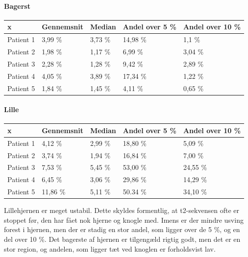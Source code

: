 \paragraph{Bagerst}

\begin{center}
    \begin{tabular}{| l | l | l | l | l |}
    \hline
    x & Gennemsnit & Median & Andel over 5 \% & Andel over 10 \% \\ \hline
    Patient 1 & 3,99 \% & 3,73 \% & 14,98 \% & 1,1 \% \\ \hline
    Patient 2 & 1,98 \% & 1,17 \% & 6,99 \% & 3,04 \% \\ \hline
    Patient 3 & 2,28 \% & 1,28 \% & 9,42 \% & 2,89 \% \\ \hline
    Patient 4 & 4,05 \% & 3,89 \% & 17,34 \% & 1,22 \% \\ \hline
    Patient 5 & 1,84 \% & 1,45 \% & 4,11 \% & 0,65 \% \\ \hline
    \end{tabular}
\end{center}

\paragraph{Lille}

\begin{center}
    \begin{tabular}{| l | l | l | l | l |}
    \hline
    x & Gennemsnit & Median & Andel over 5 \% & Andel over 10 \% \\ \hline
    Patient 1 & 4,12 \% & 2,99 \% & 18,80 \% & 5,09 \% \\ \hline
    Patient 2 & 3,74 \% & 1,94 \% & 16,84 \% & 7,00 \% \\ \hline
    Patient 3 & 7,53 \% & 5,45 \% & 53,00 \% & 24,55 \% \\ \hline
    Patient 4 & 6,45 \% & 3,06 \% & 29,86 \% & 14,29 \% \\ \hline
    Patient 5 & 11,86 \% & 5,11 \% & 50.34 \% & 34,10 \% \\ \hline
    \end{tabular}
\end{center}

Lillehjernen er meget ustabil. Dette skyldes formentlig, at t2-sekvensen
ofte er stoppet før, den har fået nok hjerne og knogle med. Imens er der
mindre usving forest i hjernen, men der er stadig en stor andel, som
ligger over de 5 \%, og en del over 10 \%. Det bagerste af hjernen er
tilgengæld rigtig godt, men det er en stor region, og andelen, som ligger
tæt ved knoglen er forholdsvist lav.

